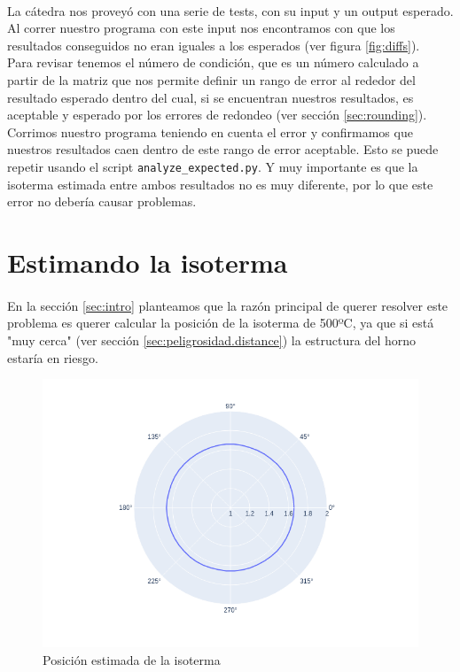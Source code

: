 \documentclass[12pt]{article}
\begin{document}
\paragraph{} La cátedra nos proveyó con una serie de tests, con su input y un output esperado. Al correr nuestro programa con este input nos encontramos con que los resultados conseguidos no eran iguales a los esperados (ver figura \ref{fig:diffs}). \\
Para revisar tenemos el número de condición, que es un número calculado a partir de la matriz que nos permite definir un rango de error al rededor del resultado esperado dentro del cual, si se encuentran nuestros resultados, es aceptable y esperado por los errores de redondeo (ver sección \ref{sec:rounding}). \\
Corrimos nuestro programa teniendo en cuenta el error y confirmamos que nuestros resultados caen dentro de este rango de error aceptable. Esto se puede repetir usando el script \texttt{analyze\_expected.py}. Y muy importante es que la isoterma estimada entre ambos resultados no es muy diferente, por lo que este error no debería causar problemas. %

\section{Estimando la isoterma}
\label{sec:peligrosidad}

\paragraph{} En la sección \ref{sec:intro} planteamos que la razón principal de querer resolver este problema es querer calcular la posición de la isoterma de 500ºC, ya que si está "muy cerca" (ver sección \ref{sec:peligrosidad.distance}) la estructura del horno estaría en riesgo.

\begin{figure}[H]
\centering
\includegraphics[scale=0.5]{complete.0.isotherm}
\caption{Posición estimada de la isoterma}
\label{fig:isotherm.pos}
\end{figure}
\end{document}
